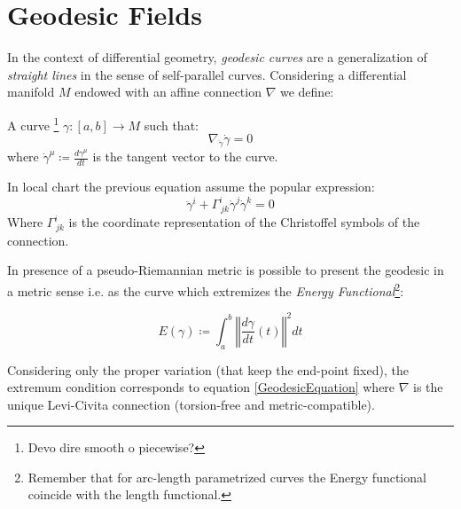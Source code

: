 \documentclass[Main]{subfiles}
\begin{document}
\chapter{Geodesic Fields}
	In the context of differential geometry, \emph{geodesic curves} are a generalization of \emph{straight lines}  in the sense of self-parallel curves.
	Considering a differential manifold $M$ endowed with an affine connection $\nabla$ we define:
	\begin{definition}[Geodesic]
		A curve \danger\footnote{Devo dire smooth o piecewise? }
		$\gamma:[a,b]\rightarrow M$ such that:
		\begin{equation}
			\nabla_{\dot{\gamma}}\dot{\gamma} =0
		\end{equation}
		where $\dot{\gamma}^\mu \coloneqq \frac{d \gamma^\mu}{d t}$ is the tangent vector to the curve.
	\end{definition}
	\begin{notationfix}
		In local chart the previous equation assume the popular expression:
		\begin{equation}\label{GeodesicEquation}
			\ddot{\gamma}^i + \Gamma^i_{\, j k} \dot{\gamma}^j \dot{\gamma}^k = 0
		\end{equation}
		Where $ \Gamma^i_{\, j k}$ is the coordinate representation of the Christoffel symbols of the connection.
	\end{notationfix}
	\vspace{4mm}
	
	In presence of a pseudo-Riemannian metric is possible to present the geodesic in a metric sense i.e. as the curve  which extremizes the \emph{Energy Functional}\footnote{Remember that for arc-length parametrized curves the Energy functional coincide with the length functional.\cite[Lemma $1.4.2$ ]{Jost2005}}:
	\begin{definition}
  	\begin{equation}\label{EnergyFunctional}
 		E(\gamma) \coloneqq \int_a^b \left\Vert \frac{d \gamma}{dt} (t)\right\Vert^2 dt
 	\end{equation}
\end{definition} 	
	Considering only the proper variation (that keep the end-point fixed), the extremum condition corresponds to equation \ref{GeodesicEquation} where $\nabla$ is the unique Levi-Civita connection (torsion-free and metric-compatible).
	\vspace{4mm}
	
\end{document}
